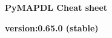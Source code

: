 \documentclass[9pt,landscape]{article}
\begin{document}
\raggedright
\footnotesize
\begin{center}
     \Huge{\textbf{PyMAPDL Cheat sheet}} \\
\end{center}
\begin{center}
     \small{\textbf{version:0.65.0 (stable)}} \\
\end{center}
\vspace{-0.15cm}
\noindent\makebox[\linewidth]{\rule{\paperwidth}{2pt}}
\end{document}
